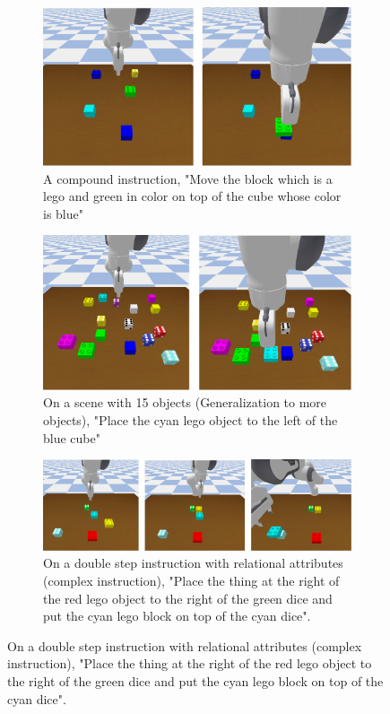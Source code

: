 \begin{figure}
    \centering
    \hfill
    \begin{subfigure}{0.45\textwidth}
        \centering
        \includegraphics[width=\textwidth]{assets/qual-1.png}
        \caption{A compound instruction, \footnotesize{"Move the block which is a lego and green in color on top of the cube whose color is blue"}}
    \end{subfigure}
    \hfill
    \begin{subfigure}{0.45\textwidth}
        \centering
        \includegraphics[width=\textwidth]{assets/qual-2.png}
        \caption{On a scene with 15 objects (Generalization to more objects), \footnotesize{"Place the cyan lego object to the left of the blue cube"}}
    \end{subfigure}
    \hfill

    \vspace{1cm}

    \begin{subfigure}{0.7\textwidth}
        \centering
        \includegraphics[width=\textwidth]{assets/qual-3.png}
        \caption{On a double step instruction with relational attributes (complex instruction), \footnotesize{"Place the thing at the right of the red lego object to the right of the green dice and put the cyan lego block on top of the cyan dice"}.}
    \end{subfigure}


\end{figure}
